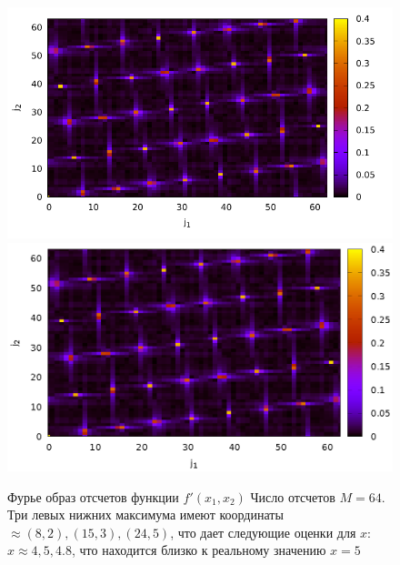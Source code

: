 \begin{figure}
\centering

\ifpdf
\includegraphics[angle=0]
{./part4/quantcomp/picellipticdiscretlog2.pdf}
\else
\includegraphics[angle=0]
{./part4/quantcomp/picellipticdiscretlog2.eps}
\fi

%

\caption{Фурье образ отсчетов функции 
$f'(x_1, x_2)$
Число отсчетов $M=64$. Три левых нижних максимума имеют координаты $\approx (8,2), (15,3), (24,5)$, что дает следующие оценки для $x$: $x \approx 4, 5, 4.8$,
что находится близко к реальному значению $x = 5$
} 
\label{fig:part4:quantcomp:dle2}
\end{figure}
